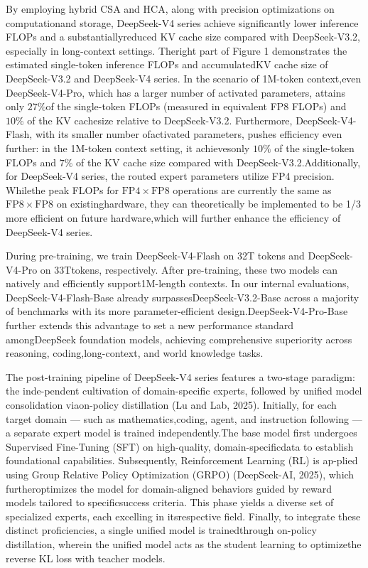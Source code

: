 \documentclass[
  10
]{article}
\begin{document}
By employing hybrid CSA and HCA, along with precision optimizations on
computationand storage, DeepSeek-V4 series achieve significantly lower
inference FLOPs and a substantiallyreduced KV cache size compared with
DeepSeek-V3.2, especially in long-context settings. Theright part of
Figure 1 demonstrates the estimated single-token inference FLOPs and
accumulatedKV cache size of DeepSeek-V3.2 and DeepSeek-V4 series. In the
scenario of 1M-token context,even DeepSeek-V4-Pro, which has a larger
number of activated parameters, attains only \(2 7 \%\)of the
single-token FLOPs (measured in equivalent FP8 FLOPs) and \(1 0 \%\) of
the KV cachesize relative to DeepSeek-V3.2. Furthermore,
DeepSeek-V4-Flash, with its smaller number ofactivated parameters,
pushes efficiency even further: in the 1M-token context setting, it
achievesonly \(1 0 \%\) of the single-token FLOPs and \(7 \%\) of the KV
cache size compared with DeepSeek-V3.2.Additionally, for DeepSeek-V4
series, the routed expert parameters utilize FP4 precision. Whilethe
peak FLOPs for \(\mathrm { F P 4 } \times \mathrm { F P 8 }\) operations
are currently the same as \(\mathrm { F P 8 } \times \mathrm { F P 8 }\)
on existinghardware, they can theoretically be implemented to be 1/3
more efficient on future hardware,which will further enhance the
efficiency of DeepSeek-V4 series.

During pre-training, we train DeepSeek-V4-Flash on 32T tokens and
DeepSeek-V4-Pro on 33Ttokens, respectively. After pre-training, these
two models can natively and efficiently support1M-length contexts. In
our internal evaluations, DeepSeek-V4-Flash-Base already
surpassesDeepSeek-V3.2-Base across a majority of benchmarks with its
more parameter-efficient design.DeepSeek-V4-Pro-Base further extends
this advantage to set a new performance standard amongDeepSeek
foundation models, achieving comprehensive superiority across reasoning,
coding,long-context, and world knowledge tasks.

The post-training pipeline of DeepSeek-V4 series features a two-stage
paradigm: the inde-pendent cultivation of domain-specific experts,
followed by unified model consolidation viaon-policy distillation (Lu
and Lab, 2025). Initially, for each target domain --- such as
mathematics,coding, agent, and instruction following --- a separate
expert model is trained independently.The base model first undergoes
Supervised Fine-Tuning (SFT) on high-quality, domain-specificdata to
establish foundational capabilities. Subsequently, Reinforcement
Learning (RL) is ap-plied using Group Relative Policy Optimization
(GRPO) (DeepSeek-AI, 2025), which furtheroptimizes the model for
domain-aligned behaviors guided by reward models tailored to
specificsuccess criteria. This phase yields a diverse set of specialized
experts, each excelling in itsrespective field. Finally, to integrate
these distinct proficiencies, a single unified model is trainedthrough
on-policy distillation, wherein the unified model acts as the student
learning to optimizethe reverse KL loss with teacher models.
\end{document}
